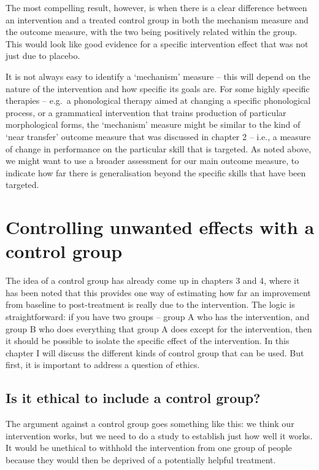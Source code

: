 \documentclass[]{book}
\begin{document}
The most compelling result, however, is when there is a clear difference between an intervention and a treated control group in both the mechanism measure and the outcome measure, with the two being positively related within the group. This would look like good evidence for a specific intervention effect that was not just due to placebo.

It is not always easy to identify a `mechanism' measure -- this will depend on the nature of the intervention and how specific its goals are. For some highly specific therapies -- e.g.~a phonological therapy aimed at changing a specific phonological process, or a grammatical intervention that trains production of particular morphological forms, the `mechanism' measure might be similar to the kind of `near transfer' outcome measure that was discussed in chapter 2 -- i.e., a measure of change in performance on the particular skill that is targeted. As noted above, we might want to use a broader assessment for our main outcome measure, to indicate how far there is generalisation beyond the specific skills that have been targeted.
 

\hypertarget{controlling-unwanted-effects-with-a-control-group}{%
\chapter{Controlling unwanted effects with a control group}\label{controlling-unwanted-effects-with-a-control-group}}

The idea of a control group has already come up in chapters 3 and 4, where it has been noted that this provides one way of estimating how far an improvement from baseline to post-treatment is really due to the intervention. The logic is straightforward: if you have two groups -- group A who has the intervention, and group B who does everything that group A does except for the intervention, then it should be possible to isolate the specific effect of the intervention. In this chapter I will discuss the different kinds of control group that can be used. But first, it is important to address a question of ethics.

\hypertarget{is-it-ethical-to-include-a-control-group}{%
\section{Is it ethical to include a control group?}\label{is-it-ethical-to-include-a-control-group}}

The argument against a control group goes something like this: we think our intervention works, but we need to do a study to establish just how well it works. It would be unethical to withhold the intervention from one group of people because they would then be deprived of a potentially helpful treatment.
\end{document}
